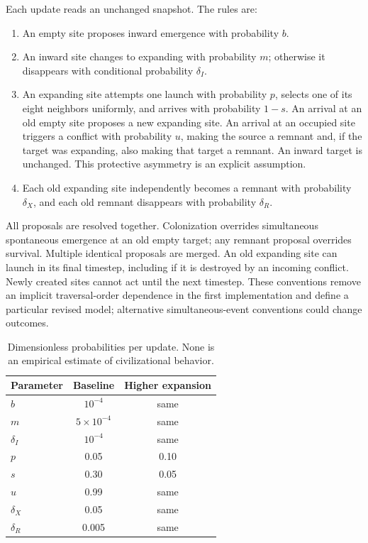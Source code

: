 \documentclass[10pt,twocolumn]{article}
\begin{document}
Each update reads an unchanged snapshot. The rules are:
\begin{enumerate}
\item An empty site proposes inward emergence with probability $b$.
\item An inward site changes to expanding with probability $m$;
otherwise it disappears with conditional probability $\delta_I$.
\item An expanding site attempts one launch with probability $p$,
selects one of its eight neighbors uniformly, and arrives with
probability $1-s$. An arrival at an old empty site proposes a new
expanding site. An arrival at an occupied site triggers a conflict
with probability $u$, making the source a remnant and, if the target
was expanding, also making that target a remnant. An inward target
is unchanged. This protective asymmetry is an explicit assumption.
\item Each old expanding site independently becomes a remnant with
probability $\delta_X$, and each old remnant disappears with
probability $\delta_R$.
\end{enumerate}
All proposals are resolved together. Colonization overrides simultaneous
spontaneous emergence at an old empty target; any remnant proposal
overrides survival. Multiple identical proposals are merged. An old
expanding site can launch in its final timestep, including if it is
destroyed by an incoming conflict. Newly created sites cannot act until
the next timestep. These conventions remove an implicit traversal-order
dependence in the first implementation and define a particular revised
model; alternative simultaneous-event conventions could change outcomes.

\begin{table}[ht]
\centering
\caption{Dimensionless probabilities per update. None is an empirical
estimate of civilizational behavior.}
\begin{tabular}{lcc}
\toprule
Parameter & Baseline & Higher expansion\\
\midrule
$b$ & $10^{-4}$ & same\\
$m$ & $5\times10^{-4}$ & same\\
$\delta_I$ & $10^{-4}$ & same\\
$p$ & 0.05 & 0.10\\
$s$ & 0.30 & 0.05\\
$u$ & 0.99 & same\\
$\delta_X$ & 0.05 & same\\
$\delta_R$ & 0.005 & same\\
\bottomrule
\end{tabular}
\label{tab:parameters}
\end{table}
\end{document}
